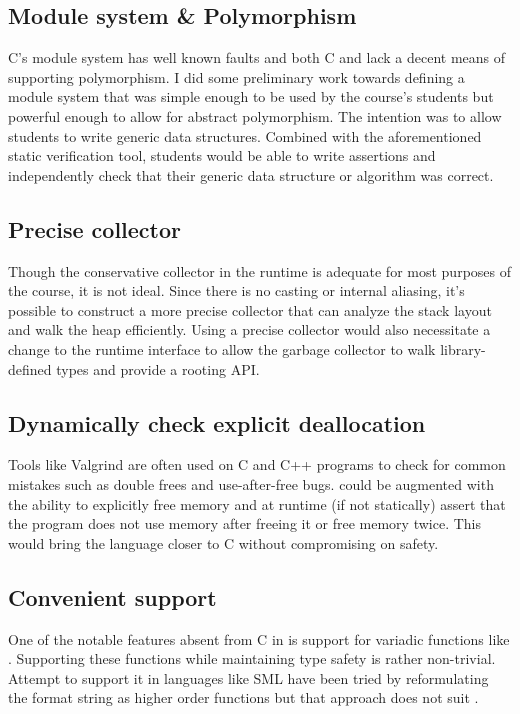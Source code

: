 \subsection{Module system \& Polymorphism}
C's module system has well known faults and both C and \langname{} lack a decent
means of supporting polymorphism. I did some preliminary work towards defining a
module system that was simple enough to be used by the course's students but
powerful enough to allow for abstract polymorphism. The intention was to allow
students to write generic data structures. Combined with the aforementioned
static verification tool, students would be able to write assertions and
independently check that their generic data structure or algorithm was correct.

\subsection{Precise collector}
Though the conservative collector in the runtime is adequate for most purposes
of the course, it is not ideal. Since there is no casting or internal aliasing,
it's possible to construct a more precise collector that can analyze the stack
layout and walk the heap efficiently. Using a precise collector would also
necessitate a change to the runtime interface to allow the garbage collector to
walk library-defined types and provide a rooting API.

\subsection{Dynamically check explicit deallocation}

Tools like Valgrind are often used on C and C++ programs to check for common
mistakes such as double frees and use-after-free bugs. \langname{} could be
augmented with the ability to explicitly free memory and at runtime (if not
statically) assert that the program does not use memory after freeing it or
free memory twice. This would bring the language closer to C without
compromising on safety.

\subsection{Convenient  support}

One of the notable features absent from C in \langname{} is support for
variadic functions like . Supporting these functions while
maintaining type safety is rather non-trivial. Attempt to support it in
languages like SML have been tried by reformulating the format string as higher
order functions but that approach does not suit \langname{}.

